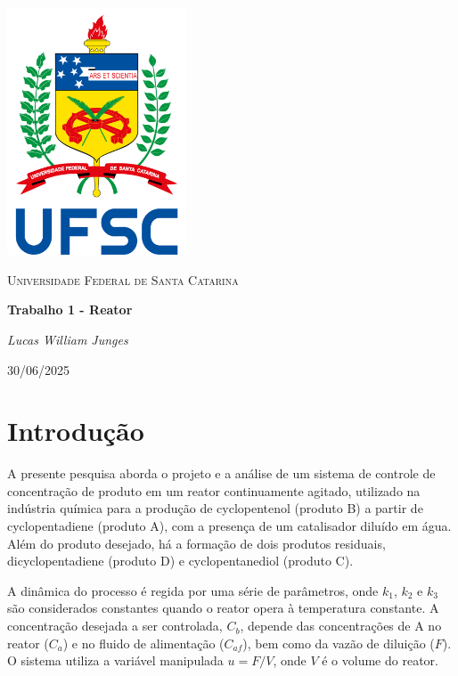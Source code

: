 \documentclass[a4paper,12pt]{report}
\newcommand{\reporttitle}{Trabalho 1 - Reator}
\newcommand{\reportauthor}{
Lucas William Junges}
\newcommand{\reportdate}{30/06/2025}
\begin{document}
\begin{titlepage}
    \centering
    \vspace*{1cm}
    \includegraphics[width=0.4\textwidth]{Imagens/BrasaoUFSC.png} %
    \par\vspace{1cm}
    {\scshape\Large Universidade Federal de Santa Catarina\par} %
    \vspace{1.2cm}
    {\huge\bfseries \reporttitle\par}
    \vspace{2cm}
    {\Large\itshape \reportauthor\par}
    \vfill
    {\large \reportdate\par}
\end{titlepage}

\listoffigures
\clearpage

\tableofcontents
\clearpage

\chapter{Introdução}
\label{chap:introducao}

A presente pesquisa aborda o projeto e a análise de um sistema de controle de concentração de produto em um reator continuamente agitado, utilizado na indústria química para a produção de cyclopentenol (produto B) a partir de cyclopentadiene (produto A), com a presença de um catalisador diluído em água. Além do produto desejado, há a formação de dois produtos residuais, dicyclopentadiene (produto D) e cyclopentanediol (produto C).

A dinâmica do processo é regida por uma série de parâmetros, onde \( k_1 \), \( k_2 \) e \( k_3 \) são considerados constantes quando o reator opera à temperatura constante. A concentração desejada a ser controlada, \( C_b \), depende das concentrações de A no reator (\( C_a \)) e no fluido de alimentação (\( C_{af} \)), bem como da vazão de diluição (\( F \)). O sistema utiliza a variável manipulada \( u = F/V \), onde \( V \) é o volume do reator.
\end{document}

